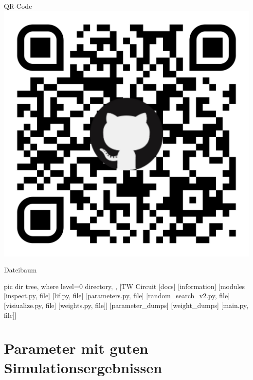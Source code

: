 \begin{minipage}[c]{0.35\textwidth}
	\begin{mybox}{QR-Code}
		\includegraphics[width=\textwidth]{figures/appendix/qr-code.pdf}
	\end{mybox}
	\begin{mybox}{Dateibaum}
		\vspace{0.3cm}
		\begin{forest}
			pic dir tree,
			where level=0{}{%
				directory,
			},
			[TW Circuit
			[docs]
			[information]
			[modules
			[inspect.py, file]
			[lif.py, file]
			[parameters.py, file]
			[random\_search\_v2.py, file]
			[visiualize.py, file]
			[weights.py, file]]
			[parameter\_dumps]
			[weight\_dumps]
			[main.py, file]]
		\end{forest}
	\end{mybox}
\end{minipage}


%
\chapter{Parameter mit guten Simulationsergebnissen}
%
\label{app:parameter}

